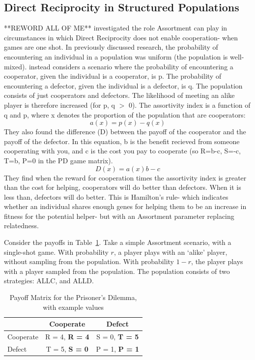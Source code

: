\documentclass[a4paper,11pt,bcshonoursthesis,singlespace,twoside,thesisdraft,pdflatex]{cssethesis}
\begin{document}
\subsection{Direct Reciprocity in Structured Populations}
**REWORD ALL OF ME**
\citet{bergstrom2003algebra} investigated the role Assortment can play in circumstances in which Direct Reciprocity does not enable cooperation- when games are one shot. 
In previously discussed research, the probability of encountering an individual in a population was uniform (the population is well-mixed). 
\citet{bergstrom2003algebra} instead considers a scenario where the probability of encountering a cooperator, given the individual is a cooperator, is p. The probability of encountering a defector, given the individual is a defector, is q. 
The population consists of just cooperators and defectors. The likelihood of meeting an alike player is therefore increased (for p, q $>$ 0). The assortivity index is a function of q and p, where x denotes the proportion of the population that are cooperators:
\begin{equation*}
a(x)=p(x)-q(x)
\end{equation*}
They also found the difference (D) between the payoff of the cooperator and the payoff of the defector. 
In this equation, b is the benefit recieved from someone cooperating with you, and c is the cost you pay to cooperate (so R=b-c, S=-c, T=b, P=0 in the PD game matrix).
\begin{equation}
D(x)=a(x)b-c
\end{equation}
They find when the reward for cooperation times the assortivity index is greater than the cost for helping, cooperators will do better than defectors. When it is less than, defectors will do better. 
This is Hamilton's rule- which indicates whether an individual shares enough genes for helping them to be an increase in fitness for the potential helper- but with an Assortment parameter replacing relatedness. 

Consider the payoffs in Table~\ref{table:payoffs2}. 
Take a simple Assortment scenario, with a single-shot game. 
With probability $r$, a player plays with an `alike' player, without sampling from the population. 
With probability $1-r$, the player plays with a player sampled from the population. 
The population consists of two strategies: ALLC, and ALLD.

\begin{table}[h]\centering
\captionsetup{justification=centering}
\begin{tabular}{|l|c|c|}
\hline
 & \bf{Cooperate} & \bf{Defect}\\
\hline
Cooperate & R = 4, \bf{R = 4} & S = 0, \bf{T = 5}\\
\hline
Defect & T = 5, \bf{S = 0}  & P = 1, \bf{P = 1} \\
\hline
\end{tabular}
\caption{Payoff Matrix for the Prisoner's Dilemma, with example values}
\label{table:payoffs2}
\end{table}
\end{document}
